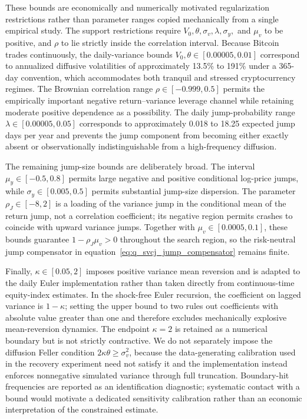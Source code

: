 These bounds are economically and numerically motivated regularization
restrictions rather than parameter ranges copied mechanically from a single
empirical study.  The support restrictions require
$V_0,\theta,\sigma_v,\lambda,\sigma_y,$ and $\mu_v$ to be positive, and
$\rho$ to lie strictly inside the correlation interval.  Because Bitcoin
trades continuously, the daily-variance bounds
$V_0,\theta\in[0.00005,0.01]$ correspond to annualized diffusive
volatilities of approximately 13.5\% to 191\% under a 365-day convention,
which accommodates both tranquil and stressed cryptocurrency regimes.  The
Brownian correlation range $\rho\in[-0.999,0.5]$ permits the empirically
important negative return--variance leverage channel while retaining moderate
positive dependence as a possibility.  The daily jump-probability range
$\lambda\in[0.00005,0.05]$ corresponds to approximately 0.018 to 18.25
expected jump days per year and prevents the jump component from becoming
either exactly absent or observationally indistinguishable from a high-frequency
diffusion.

The remaining jump-size bounds are deliberately broad.  The interval
$\mu_y\in[-0.5,0.8]$ permits large negative and positive conditional log-price
jumps, while $\sigma_y\in[0.005,0.5]$ permits substantial jump-size
dispersion.  The parameter $\rho_J\in[-8,2]$ is a loading of the variance jump
in the conditional mean of the return jump, not a correlation coefficient;
its negative region permits crashes to coincide with upward variance jumps.
Together with $\mu_v\in[0.0005,0.1]$, these bounds guarantee
$1-\rho_J\mu_v>0$ throughout the search region, so the risk-neutral jump
compensator in equation~\eqref{eq:q_svcj_jump_compensator} remains finite.

Finally, $\kappa\in[0.05,2]$ imposes positive variance mean reversion and is
adapted to the daily Euler implementation rather than taken directly from
continuous-time equity-index estimates.  In the shock-free Euler recursion,
the coefficient on lagged variance is $1-\kappa$; setting the upper bound to
two rules out coefficients with absolute value greater than one and therefore
excludes mechanically explosive mean-reversion dynamics.  The endpoint
$\kappa=2$ is retained as a numerical boundary but is not strictly
contractive.  We do not separately impose the diffusion Feller condition
$2\kappa\theta\geq\sigma_v^2$, because the data-generating calibration used
in the recovery experiment need not satisfy it and the implementation instead
enforces nonnegative simulated variance through full truncation.  Boundary-hit
frequencies are reported as an identification diagnostic; systematic contact
with a bound would motivate a dedicated sensitivity calibration rather than an
economic interpretation of the constrained estimate.

